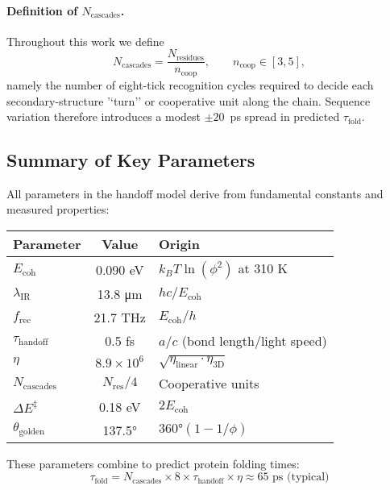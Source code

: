\documentclass[12pt,twocolumn]{article}
\begin{document}
\paragraph{Definition of $N_{\mathrm{cascades}}$.}  Throughout this work we define
\begin{equation}
  N_{\mathrm{cascades}}=\frac{N_{\mathrm{residues}}}{n_{\mathrm{coop}}},\qquad n_{\mathrm{coop}}\in[3,5],
\end{equation}
namely the number of eight-tick recognition cycles required to decide each secondary-structure '‘turn’’ or cooperative unit along the chain.  Sequence variation therefore introduces a modest $\pm20$~ps spread in predicted $\tau_{\mathrm{fold}}$.

\subsection{Summary of Key Parameters}

All parameters in the handoff model derive from fundamental constants and measured properties:

\begin{center}
\begin{tabular}{|l|c|l|}
\hline
Parameter & Value & Origin \\
\hline
$E_{\text{coh}}$ & 0.090 eV & $k_B T \ln(\phi^2)$ at 310 K \\
$\lambda_{\text{IR}}$ & 13.8 μm & $hc/E_{\text{coh}}$ \\
$f_{\text{rec}}$ & 21.7 THz & $E_{\text{coh}}/h$ \\
$\tau_{\text{handoff}}$ & 0.5 fs & $a/c$ (bond length/light speed) \\
$\eta$ & $8.9 \times 10^6$ & $\sqrt{\eta_{\text{linear}} \cdot \eta_{\text{3D}}}$ \\
$N_{\text{cascades}}$ & $N_{\text{res}}/4$ & Cooperative units \\
$\Delta E^{\ddagger}$ & 0.18 eV & $2 E_{\text{coh}}$ \\
$\theta_{\text{golden}}$ & 137.5° & $360°(1 - 1/\phi)$ \\
\hline
\end{tabular}
\end{center}

These parameters combine to predict protein folding times:
\begin{equation}
\tau_{\text{fold}} = N_{\text{cascades}} \times 8 \times \tau_{\text{handoff}} \times \eta \approx 65 \text{ ps (typical)}
\end{equation}
\end{document}
